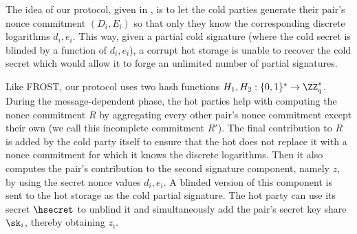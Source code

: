 The idea of our protocol, given in , is to let the cold parties generate their pair's nonce commitment $(D_i, E_i)$ so that only they know the corresponding discrete logarithms $d_i, e_i$. This way, given a partial cold signature (where the cold secret is blinded by a function of $d_i, e_i$), a corrupt hot storage is unable to recover the cold secret which would allow it to forge an unlimited number of partial signatures. 

Like FROST, our protocol uses two hash functions $H_1, H_2 : \{0,1\}^* \to \ZZ_q^*$.
During the message-dependent phase, the hot parties help with computing the nonce commitment $R$ by aggregating every other pair's nonce commitment except their own (we call this incomplete commitment $R'$). The final contribution to $R$ is added by the cold party itself to ensure that the hot does not replace it with a nonce commitment for which it knows the discrete logarithms. Then it also computes the pair's contribution to the second signature component, namely $z$, by using the secret nonce values $d_i, e_i$. A blinded version of this component is sent to the hot storage as the cold partial signature. The hot party can use its secret $\hsecret$ to unblind it and simultaneously add the pair's secret key share $\sk_i$, thereby obtaining $z_i$.




